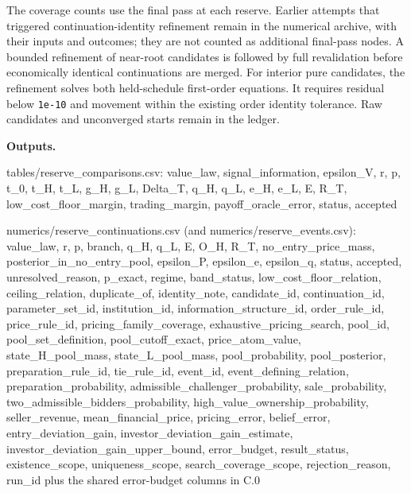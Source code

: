 \documentclass[
  11pt,
]{article}
\newenvironment{Shaded}{}{}
\newcommand{\NormalTok}[1]{#1}
\begin{document}
The coverage counts use the final pass at each reserve. Earlier attempts
that triggered continuation-identity refinement remain in the numerical
archive, with their inputs and outcomes; they are not counted as
additional final-pass nodes. A bounded refinement of near-root
candidates is followed by full revalidation before economically
identical continuations are merged. For interior pure candidates, the
refinement solves both held-schedule first-order equations. It requires
residual below \texttt{1e-10} and movement within the existing order
identity tolerance. Raw candidates and unconverged starts remain in the
ledger.



\textbf{Outputs.}

\begin{Shaded}
\begin{Highlighting}[]
\NormalTok{tables/reserve\_comparisons.csv:}
\NormalTok{value\_law, signal\_information, epsilon\_V, r, p,}
\NormalTok{t\_0, t\_H, t\_L, g\_H, g\_L, Delta\_T,}
\NormalTok{q\_H, q\_L, e\_H, e\_L, E, R\_T,}
\NormalTok{low\_cost\_floor\_margin, trading\_margin, payoff\_oracle\_error,}
\NormalTok{status, accepted}

\NormalTok{numerics/reserve\_continuations.csv (and numerics/reserve\_events.csv):}
\NormalTok{value\_law, r, p, branch, q\_H, q\_L,}
\NormalTok{E, O\_H, R\_T, no\_entry\_price\_mass, posterior\_in\_no\_entry\_pool,}
\NormalTok{epsilon\_P, epsilon\_e, epsilon\_q, status, accepted, unresolved\_reason,}
\NormalTok{p\_exact, regime, band\_status, low\_cost\_floor\_relation, ceiling\_relation,}
\NormalTok{duplicate\_of, identity\_note,}
\NormalTok{candidate\_id, continuation\_id, parameter\_set\_id, institution\_id,}
\NormalTok{information\_structure\_id, order\_rule\_id, price\_rule\_id,}
\NormalTok{pricing\_family\_coverage, exhaustive\_pricing\_search,}
\NormalTok{pool\_id, pool\_set\_definition, pool\_cutoff\_exact, price\_atom\_value,}
\NormalTok{state\_H\_pool\_mass, state\_L\_pool\_mass, pool\_probability, pool\_posterior,}
\NormalTok{preparation\_rule\_id, tie\_rule\_id, event\_id, event\_defining\_relation,}
\NormalTok{preparation\_probability, admissible\_challenger\_probability, sale\_probability,}
\NormalTok{two\_admissible\_bidders\_probability, high\_value\_ownership\_probability,}
\NormalTok{seller\_revenue, mean\_financial\_price,}
\NormalTok{pricing\_error, belief\_error, entry\_deviation\_gain,}
\NormalTok{investor\_deviation\_gain\_estimate, investor\_deviation\_gain\_upper\_bound,}
\NormalTok{error\_budget, result\_status, existence\_scope, uniqueness\_scope,}
\NormalTok{search\_coverage\_scope, rejection\_reason, run\_id}
\NormalTok{plus the shared error{-}budget columns in C.0}


\end{Highlighting}
\end{Shaded}
\end{document}
